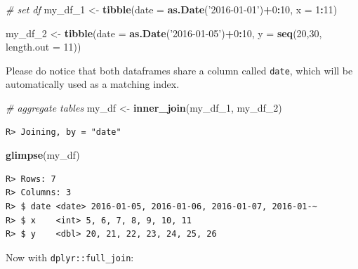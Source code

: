\documentclass[
  12pt,
]{book}
\newenvironment{Shaded}{\begin{snugshade}}{\end{snugshade}}
\newcommand{\CommentTok}[1]{\textcolor[rgb]{0.37,0.37,0.37}{\textit{#1}}}
\newcommand{\DataTypeTok}[1]{\textcolor[rgb]{0.27,0.27,0.27}{#1}}
\newcommand{\DecValTok}[1]{\textcolor[rgb]{0.06,0.06,0.06}{#1}}
\newcommand{\KeywordTok}[1]{\textcolor[rgb]{0.27,0.27,0.27}{\textbf{#1}}}
\newcommand{\NormalTok}[1]{#1}
\newcommand{\OperatorTok}[1]{\textcolor[rgb]{0.43,0.43,0.43}{\textbf{#1}}}
\newcommand{\StringTok}[1]{\textcolor[rgb]{0.5,0.5,0.5}{#1}}
\begin{document}
\begin{Shaded}
\begin{Highlighting}[]
\CommentTok{# set df}
\NormalTok{my_df_}\DecValTok{1}\NormalTok{ <-}\StringTok{ }\KeywordTok{tibble}\NormalTok{(}\DataTypeTok{date =} \KeywordTok{as.Date}\NormalTok{(}\StringTok{'2016-01-01'}\NormalTok{)}\OperatorTok{+}\DecValTok{0}\OperatorTok{:}\DecValTok{10}\NormalTok{,}
                  \DataTypeTok{x =} \DecValTok{1}\OperatorTok{:}\DecValTok{11}\NormalTok{)}

\NormalTok{my_df_}\DecValTok{2}\NormalTok{ <-}\StringTok{ }\KeywordTok{tibble}\NormalTok{(}\DataTypeTok{date =} \KeywordTok{as.Date}\NormalTok{(}\StringTok{'2016-01-05'}\NormalTok{)}\OperatorTok{+}\DecValTok{0}\OperatorTok{:}\DecValTok{10}\NormalTok{,}
                  \DataTypeTok{y =} \KeywordTok{seq}\NormalTok{(}\DecValTok{20}\NormalTok{,}\DecValTok{30}\NormalTok{, }\DataTypeTok{length.out =} \DecValTok{11}\NormalTok{))}
\end{Highlighting}
\end{Shaded}

Please do notice that both dataframes share a column called \texttt{date}, which will be automatically used as a matching index.

\begin{Shaded}
\begin{Highlighting}[]
\CommentTok{# aggregate tables}
\NormalTok{my_df <-}\StringTok{ }\KeywordTok{inner_join}\NormalTok{(my_df_}\DecValTok{1}\NormalTok{, }
\NormalTok{                    my_df_}\DecValTok{2}\NormalTok{)}
\end{Highlighting}
\end{Shaded}

\begin{verbatim}
R> Joining, by = "date"
\end{verbatim}

\begin{Shaded}
\begin{Highlighting}[]
\KeywordTok{glimpse}\NormalTok{(my_df)}
\end{Highlighting}
\end{Shaded}

\begin{verbatim}
R> Rows: 7
R> Columns: 3
R> $ date <date> 2016-01-05, 2016-01-06, 2016-01-07, 2016-01-~
R> $ x    <int> 5, 6, 7, 8, 9, 10, 11
R> $ y    <dbl> 20, 21, 22, 23, 24, 25, 26
\end{verbatim}

Now with \texttt{dplyr::full\_join}:
\end{document}
